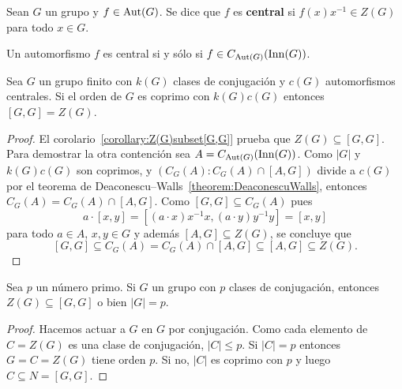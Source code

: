 \begin{definition}
	Sean $G$ un grupo y $f\in\operatorname{Aut}(G)$. Se dice que $f$ es \textbf{central} si
	$f(x)x^{-1}\in Z(G)$ para todo $x\in G$.
\end{definition}

\begin{remark}
	Un automorfismo $f$ es central si y sólo si 
	$f\in C_{\operatorname{Aut}(G)}(\mathrm{Inn}(G))$.
\end{remark}

\begin{corollary}
	Sea $G$ un grupo finito con $k(G)$ clases de conjugación y $c(G)$
	automorfismos centrales. Si el orden de $G$ es coprimo con $k(G)c(G)$
	entonces $[G,G]=Z(G)$.
\end{corollary}

\begin{proof}
	El corolario~\ref{corollary:Z(G)subset[G,G]} prueba que $Z(G)\subseteq [G,G]$. Para demostrar la otra contención 
	sea $A=C_{\operatorname{Aut}(G)}(\mathrm{Inn}(G))$. Como $|G|$ y $k(G)c(G)$ son coprimos, 
	y $(C_G(A):C_G(A)\cap [A,G])$ divide a $c(G)$ por 
	el teorema
	de Deaconescu--Walls~\ref{theorem:DeaconescuWalls}, entonces $C_G(A)=C_G(A)\cap [A,G]$. 
	Como $[G,G]\subseteq C_G(A)$ pues
	\[
		a\cdot [x,y]=[(a\cdot x)x^{-1}x,(a\cdot y)y^{-1}y]=[x,y]
	\]
	para todo $a\in A$, $x,y\in G$ y además $[A,G]\subseteq Z(G)$, se concluye
	que 
	\[
	[G,G]\subseteq C_G(A)=C_G(A)\cap [A,G]\subseteq [A,G]\subseteq Z(G).
	\]
\end{proof}

\begin{corollary}
  Sea $p$ un número primo.  Si $G$ un grupo con $p$ clases de conjugación,
  entonces $Z(G)\subseteq[G,G]$ o bien $|G|=p$. 
\end{corollary}

\begin{proof}
  Hacemos actuar a $G$ en $G$ por conjugación.  Como cada elemento de $C=Z(G)$
  es una clase de conjugación, $|C|\leq p$. Si $|C|=p$ entonces $G=C=Z(G)$
  tiene orden $p$. Si no, $|C|$ es coprimo con $p$ y luego $C\subseteq
  N=[G,G]$.
\end{proof}

